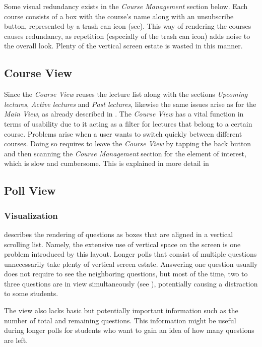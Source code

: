 Some visual redundancy exists in the \emph{Course Management} section below. Each course consists of a box with the course's name along with an unsubscribe button, represented by a trash can icon (see). This way of rendering the courses causes redundancy, as repetition (especially of the trash can icon) adds noise to the overall look. Plenty of the vertical screen estate is wasted in this manner.
\subsection{Course View}
\label{section:con:problems:courseview}
Since the \emph{Course View} reuses the lecture list along with the sections \emph{Upcoming lectures}, \emph{Active lectures} and \emph{Past lectures}, likewise the same issues arise as for the \emph{Main View}, as already described in . 
The \emph{Course View} has a vital function in terms of usability due to it acting as a filter for lectures that belong to a certain course. Problems arise when a user wants to switch quickly between different courses. Doing so requires to leave the \emph{Course View} by tapping the back button and then scanning the \emph{Course Management} section for the element of interest, which is slow and cumbersome. This is explained in more detail in 

\subsection{Poll View}

\subsubsection{Visualization}
\label{section:con:problems:pollview}

 describes the rendering of questions as boxes that are aligned in a vertical scrolling list. Namely, the extensive use of vertical space on the screen is one problem introduced by this layout. Longer polls that consist of multiple questions unnecessarily take plenty of vertical screen estate. 
Answering one question usually does not require to see the neighboring questions, but most of the time, two to three questions are in view simultaneously (see ), potentially causing a distraction to some students.

The view also lacks basic but potentially important information such as the number of total and remaining questions. This information might be useful during longer polls for students who want to gain an idea of how many questions are left.

